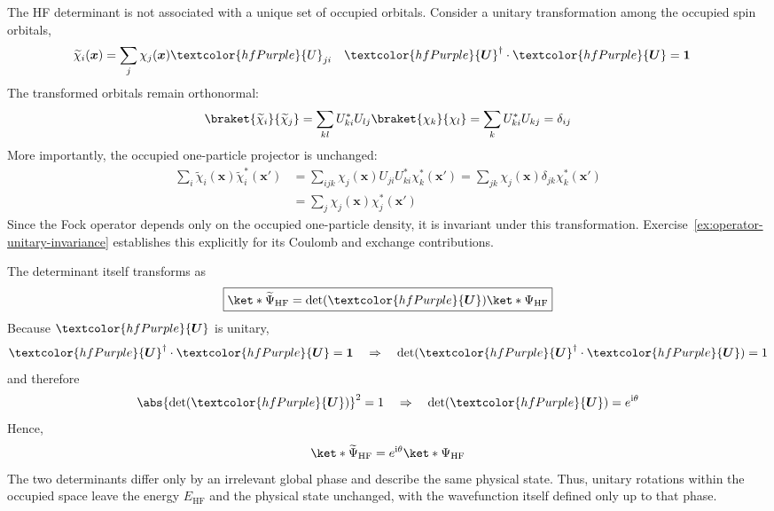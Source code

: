 \documentclass[11pt,a4paper,titlepage]{article}
\numberwithin{equation}{section}
\newcommand{\bx}{\boldsymbol{x}}
\newcommand{\bI}{\boldsymbol{1}}
\newcommand{\bU}{\boldsymbol{U}}
\newcommand{\purple}[1]{\textcolor{hfPurple}{#1}}
\newcommand{\ii}{\mathrm{i}}
\begin{document}
The HF determinant is not associated with a unique set of occupied
orbitals. Consider a unitary transformation among the occupied spin
orbitals,
\begin{align}
  \widetilde{\chi}_i(\bx)
  &=
  \sum_j
  \chi_j(\bx)
  \purple{U}_{ji}
  &
  \purple{\bU}^\dag\cdot\purple{\bU}
  &=
  \bI
  \label{eq:occupied-unitary-rotation}
\end{align}
The transformed orbitals remain orthonormal:
\begin{equation}
  \braket{\widetilde{\chi}_i}{\widetilde{\chi}_j}
  =
  \sum_{kl}
  U_{ki}^*
  U_{lj}
  \braket{\chi_k}{\chi_l}
  =
  \sum_k
  U_{ki}^*U_{kj}
  =
  \delta_{ij}
\end{equation}
More importantly, the occupied one-particle projector is unchanged:
\begin{equation}
\begin{split}
  \sum_i
  \widetilde{\chi}_i(\bx)
  \widetilde{\chi}_i^*(\bx')
  &=
  \sum_{ijk}
  \chi_j(\bx)
  U_{ji}
  U_{ki}^*
  \chi_k^*(\bx')
  =
  \sum_{jk}
  \chi_j(\bx)
  \delta_{jk}
  \chi_k^*(\bx')
  \\
  &=
  \sum_j
  \chi_j(\bx)
  \chi_j^*(\bx')
\end{split}
\end{equation}
Since the Fock operator depends only on the occupied one-particle density,
it is invariant under this transformation. Exercise~\ref{ex:operator-unitary-invariance}
establishes this explicitly for its Coulomb and exchange contributions.

The determinant itself transforms as
\begin{equation}
  \boxed{
  \ket*{\widetilde{\Psi}_\text{HF}}
  =
  \det(\purple{\bU})
  \ket*{\Psi_\text{HF}}
  }
  \label{eq:det-unitary-transform}
\end{equation}
Because $\purple{\bU}$ is unitary,
\begin{equation}
  \purple{\bU}^{\dag}\cdot\purple{\bU}
  =
  \bI
  \quad\Rightarrow\quad
  \det(
    \purple{\bU}^{\dag}\cdot\purple{\bU}
  )
  =
  1
\end{equation}
and therefore
\begin{equation}
  \abs{\det(\purple{\bU})}^2
  =
  1
  \quad\Rightarrow\quad
  \det(\purple{\bU})
  =
  e^{\ii\theta}
\end{equation}
Hence,
\begin{equation}
  \ket*{\widetilde{\Psi}_\text{HF}}
  =
  e^{\ii\theta}
  \ket*{\Psi_\text{HF}}
\end{equation}
The two determinants differ only by an irrelevant global phase and describe
the same physical state.
Thus, unitary rotations within the occupied space leave
the energy $E_\text{HF}$ and the physical state unchanged, with the
wavefunction itself defined only up to that phase.
\end{document}
